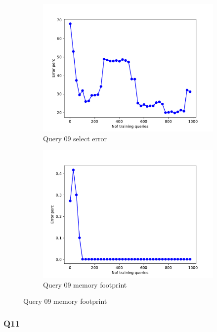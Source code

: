 \begin{figure}[t!]
  \begin{subfigure}[t]{0.5\textwidth}
    \includegraphics[scale=0.4]{figs/airtraffic/airtraffic_sel09_error.pdf}
    \caption{Query 09 select error}
    \label{fig:sel19}
  \end{subfigure}
  \begin{subfigure}[t]{0.5\textwidth}
    \includegraphics[scale=0.4]{figs/airtraffic/airtraffic_q09_memerror.pdf}
    \caption{Query 09 memory footprint}
    \label{fig:sel19}
   \end{subfigure}
\end{figure}

\subsubsection{Q11}

